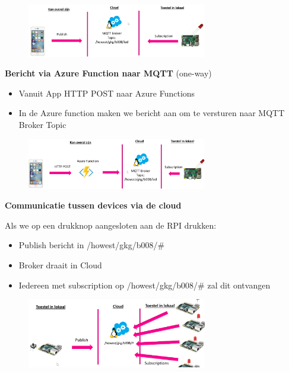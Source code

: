 \documentclass{article}
\newcommand{\bold}[1]{\textbf{#1}}
\begin{document}
\begin{figure}[H]
    \centering
    \includegraphics[width=0.7\textwidth]{mqtt-com1.png}
    \caption{}
\end{figure}


\bold{Bericht via Azure Function naar MQTT} (one-way)

\begin{itemize}
    \item Vanuit App HTTP POST naar Azure Functions
    \item In de Azure function maken we bericht aan om te versturen naar MQTT Broker Topic
\end{itemize}

\begin{figure}[H]
    \centering
    \includegraphics[width=0.7\textwidth]{mqtt-com2.png}
    \caption{}
\end{figure}

\bold{Communicatie tussen devices via de cloud}

Als we op een drukknop aangesloten aan de RPI drukken: 
\begin{itemize}
    \item Publish bericht in /howest/gkg/b008/\#
    \item Broker draait in Cloud
    \item Iedereen met subscription op /howest/gkg/b008/\# zal dit ontvangen
\end{itemize}

\begin{figure}[H]
    \centering
    \includegraphics[width=0.7\textwidth]{mqtt-com3.png}
    \caption{}
\end{figure}
\end{document}
